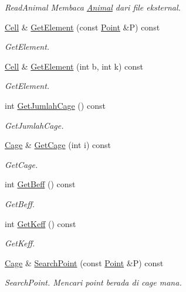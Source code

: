 \begin{DoxyCompactItemize}
\begin{DoxyCompactList}\small\item\em Read\+Animal Membaca \hyperlink{classAnimal}{Animal} dari file eksternal. \end{DoxyCompactList}\item 
\hyperlink{classCell}{Cell} \& \hyperlink{classZoo_a0128c0b360793ac6aa8922b4cf2cc57f}{Get\+Element} (const \hyperlink{classPoint}{Point} \&P) const 
\begin{DoxyCompactList}\small\item\em Get\+Element. \end{DoxyCompactList}\item 
\hyperlink{classCell}{Cell} \& \hyperlink{classZoo_a5d21cf8cb0acdc6d4c9b625699a1d4a9}{Get\+Element} (int b, int k) const 
\begin{DoxyCompactList}\small\item\em Get\+Element. \end{DoxyCompactList}\item 
int \hyperlink{classZoo_ae0465354e9418560540b516b8563a590}{Get\+Jumlah\+Cage} () const 
\begin{DoxyCompactList}\small\item\em Get\+Jumlah\+Cage. \end{DoxyCompactList}\item 
\hyperlink{classCage}{Cage} \& \hyperlink{classZoo_a3956c403bc9f854aba57146896d264ea}{Get\+Cage} (int i) const 
\begin{DoxyCompactList}\small\item\em Get\+Cage. \end{DoxyCompactList}\item 
int \hyperlink{classZoo_a21590932eb500dd07226c1bbe2ce4726}{Get\+Beff} () const 
\begin{DoxyCompactList}\small\item\em Get\+Beff. \end{DoxyCompactList}\item 
int \hyperlink{classZoo_a759d40e997b024236da2a503662dca88}{Get\+Keff} () const 
\begin{DoxyCompactList}\small\item\em Get\+Keff. \end{DoxyCompactList}\item 
\hyperlink{classCage}{Cage} \& \hyperlink{classZoo_a99470f6b1415873b4e5f8cd25b2cf5a6}{Search\+Point} (const \hyperlink{classPoint}{Point} \&P) const 
\begin{DoxyCompactList}\small\item\em Search\+Point. Mencari point berada di cage mana. \end{DoxyCompactList}\item 

\end{DoxyCompactItemize}

